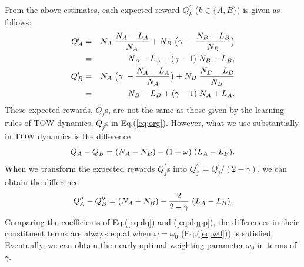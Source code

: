 \documentclass[twocolumn,showpacs,preprintnumbers,amsmath,amssymb]{revtex4}
\begin{document}
From the above estimates, each expected reward $Q^{\prime}_k$ ($k\in \{A,B\}$) is given as follows:
\begin{eqnarray}
Q^{\prime}_A & = & N_A \hspace{1mm} \frac{N_A - L_A}{N_A} + N_B \hspace{1mm} \bigl( \gamma \hspace{1mm} - \frac{N_B - L_B}{N_B} \bigr) \nonumber \\
 & = & N_A - L_A + (\gamma - 1) \hspace{1mm} N_B + L_B, \label{eq:qAp}\\
Q^{\prime}_B & = & N_A\hspace{1mm} \bigl( \gamma \hspace{1mm} - \frac{N_A - L_A}{N_A} \bigr) + N_B\hspace{1mm} \frac{N_B - L_B}{N_B} \nonumber \\
& = & N_B - L_B + (\gamma - 1) \hspace{1mm} N_A + L_A. \label{eq:qBp}
\end{eqnarray}
These expected rewards, $Q^{\prime}_j$s, are not the same as those given by the learning rules of TOW dynamics, $Q_j$s in Eq.(\ref{eq:org}).  
However, what we use substantially in TOW dynamics is the difference
\begin{equation}
Q_A - Q_B  =  (N_A - N_B) - (1 + \omega)\hspace{1mm}(L_A - L_B)\label{eq:dq}.
\end{equation}
When we transform the expected rewards $Q^{\prime}_j$s into $Q^{\prime \prime}_j  =  Q^{\prime}_j / (2 - \gamma)$, 
we can obtain the difference
\begin{equation}
Q^{\prime \prime}_A - Q^{\prime \prime}_B  =  (N_A - N_B) - \frac{2}{2-\gamma} \hspace{1mm} (L_A - L_B). \label{eq:dqpp}
\end{equation}
Comparing the coefficients of Eq.(\ref{eq:dq}) and (\ref{eq:dqpp}), the differences in their constituent terms are always equal when $\omega=\omega_0$ (Eq.(\ref{eq:w0})) is satisfied.
Eventually, we can obtain the nearly optimal weighting parameter $\omega_0$ in terms of $\gamma$.
\end{document}
